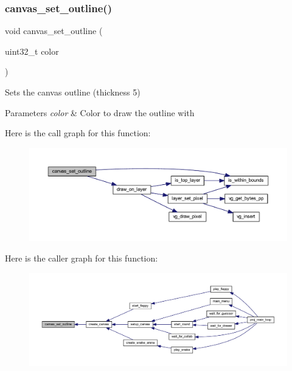 \subsubsection{\texorpdfstring{canvas\+\_\+set\+\_\+outline()}{canvas\_set\_outline()}}
{\footnotesize\ttfamily void canvas\+\_\+set\+\_\+outline (\begin{DoxyParamCaption}\item[{uint32\+\_\+t}]{color }\end{DoxyParamCaption})}



Sets the canvas outline (thickness 5) 


\begin{DoxyParams}{Parameters}
{\em color} & Color to draw the outline with \\
\hline
\end{DoxyParams}
Here is the call graph for this function\+:\nopagebreak
\begin{figure}[H]
\begin{center}
\leavevmode
\includegraphics[width=350pt]{group__canvas_ga042599a460db7bc889fdf51cb56ae732_cgraph}
\end{center}
\end{figure}
Here is the caller graph for this function\+:\nopagebreak
\begin{figure}[H]
\begin{center}
\leavevmode
\includegraphics[width=350pt]{group__canvas_ga042599a460db7bc889fdf51cb56ae732_icgraph}
\end{center}
\end{figure}
\mbox{\label{group__canvas_ga3a6a181542db6b70c3aadc411073943d}} 
